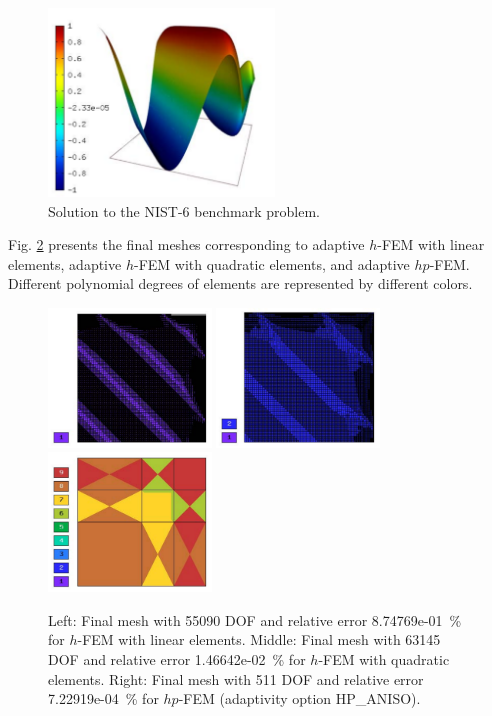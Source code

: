 \documentclass[12pt]{elsarticle}
\begin{document}
\begin{figure}[H]
\centering
\vspace{-3mm}
\includegraphics[height=5cm]{mafig35.pdf}
\caption{Solution to the NIST-6 benchmark problem.}
\vspace{-3mm}
\label{fig:sln-nist06}
\end{figure}

Fig. \ref{fig:nist-6-hp-aniso} presents the final meshes corresponding to adaptive $h$-FEM with
linear elements, adaptive $h$-FEM with quadratic elements, and adaptive $hp$-FEM. Different
polynomial degrees of elements are represented by different colors.

\begin{figure}[H]
\centering
\includegraphics[height=3.7cm]{mafig36.pdf}
\includegraphics[height=3.7cm]{mafig37.pdf}
\includegraphics[height=3.7cm]{mafig38.pdf}
\caption{
Left: Final mesh with 55090 DOF and relative error 8.74769e-01~\% for $h$-FEM with linear elements.
Middle: Final mesh with 63145 DOF and relative error 1.46642e-02~\% for $h$-FEM with quadratic elements.
Right: Final mesh with 511 DOF and relative error 7.22919e-04~\% for $hp$-FEM (adaptivity option HP\_ANISO).}
\vspace{-2mm}
\label{fig:nist-6-hp-aniso}
\end{figure}
\end{document}
